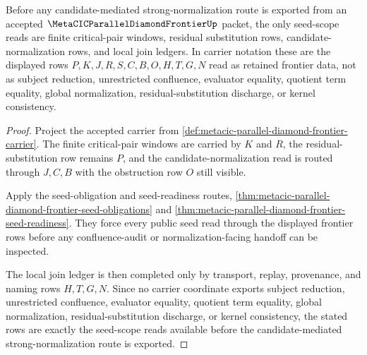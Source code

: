 \begin{theorem}
\label{thm:metacic-parallel-diamond-frontier-seed-scope}
Before any candidate-mediated strong-normalization route is exported from an accepted $\MetaCICParallelDiamondFrontierUp$ packet, the only seed-scope reads are finite critical-pair windows, residual substitution rows, candidate-normalization rows, and local join ledgers. In carrier notation these are the displayed rows $P,K,J,R,S,C,B,O,H,T,G,N$ read as retained frontier data, not as subject reduction, unrestricted confluence, evaluator equality, quotient term equality, global normalization, residual-substitution discharge, or kernel consistency.
\end{theorem}
\begin{proof}
Project the accepted carrier from \autoref{def:metacic-parallel-diamond-frontier-carrier}. The finite critical-pair windows are carried by $K$ and $R$, the residual-substitution row remains $P$, and the candidate-normalization read is routed through $J,C,B$ with the obstruction row $O$ still visible.

Apply the seed-obligation and seed-readiness routes, \autoref{thm:metacic-parallel-diamond-frontier-seed-obligations} and \autoref{thm:metacic-parallel-diamond-frontier-seed-readiness}. They force every public seed read through the displayed frontier rows before any confluence-audit or normalization-facing handoff can be inspected.

The local join ledger is then completed only by transport, replay, provenance, and naming rows $H,T,G,N$. Since no carrier coordinate exports subject reduction, unrestricted confluence, evaluator equality, quotient term equality, global normalization, residual-substitution discharge, or kernel consistency, the stated rows are exactly the seed-scope reads available before the candidate-mediated strong-normalization route is exported.
\end{proof}

